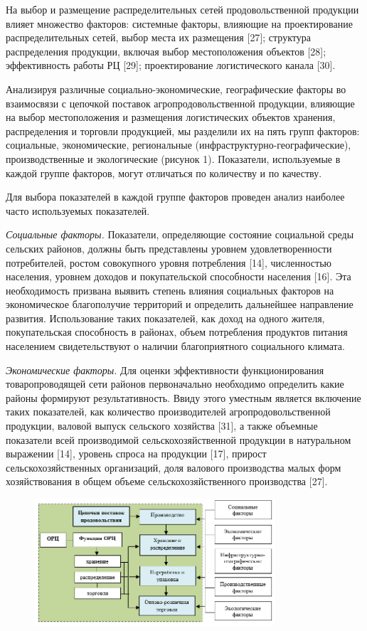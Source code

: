 На выбор и размещение распределительных сетей продовольственной
продукции влияет множество факторов: системные факторы, влияющие на
проектирование распределительных сетей, выбор места их размещения
{[}27{]}; структура распределения продукции, включая выбор
местоположения объектов {[}28{]}; эффективность работы РЦ {[}29{]};
проектирование логистического канала {[}30{]}.

Анализируя различные социально-экономические, географические факторы во
взаимосвязи с цепочкой поставок агропродовольственной продукции,
влияющие на выбор местоположения и размещения логистических объектов
хранения, распределения и торговли продукцией, мы разделили их на пять
групп факторов: социальные, экономические, региональные
(инфраструктурно-географические), производственные и экологические
(рисунок 1). Показатели, используемые в каждой группе факторов, могут
отличаться по количеству и по качеству.

Для выбора показателей в каждой группе факторов проведен анализ наиболее
часто используемых показателей.

\emph{Социальные факторы.} Показатели, определяющие состояние социальной
среды сельских районов, должны быть представлены уровнем
удовлетворенности потребителей, ростом совокупного уровня потребления
{[}14{]}, численностью населения, уровнем доходов и покупательской
способности населения {[}16{]}. Эта необходимость призвана выявить
степень влияния социальных факторов на экономическое благополучие
территорий и определить дальнейшее направление развития. Использование
таких показателей, как доход на одного жителя, покупательская
способность в районах, объем потребления продуктов питания населением
свидетельствуют о наличии благоприятного социального климата.

\emph{Экономические факторы.} Для оценки эффективности функционирования
товаропроводящей сети районов первоначально необходимо определить какие
районы формируют результативность. Ввиду этого уместным является
включение таких показателей, как количество производителей
агропродовольственной продукции, валовой выпуск сельского хозяйства
{[}31{]}, а также объемные показатели всей производимой
сельскохозяйственной продукции в натуральном выражении {[}14{]}, уровень
спроса на продукции {[}17{]}, прирост сельскохозяйственных организаций,
доля валового производства малых форм хозяйствования в общем объеме
сельскохозяйственного производства {[}27{]}.

\begin{figure}[H]
	\centering
	\includegraphics[width=0.8\textwidth]{media/ekon2/image8}
	\caption*{}
\end{figure}



